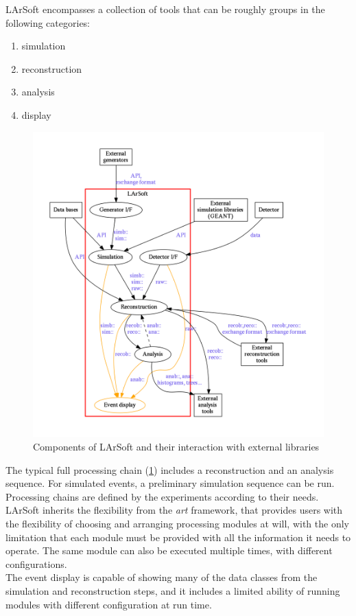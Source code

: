 
LArSoft encompasses a collection of tools that can be roughly groups in
the following categories:

\begin{enumerate}
  \item simulation
  \item reconstruction
  \item analysis
  \item[\textbullet] display
\end{enumerate}

\begin{figure}[htbp]
\centering
\includegraphics[width=\textwidth]{figures/LArSoftArchitectureGraph.pdf}
\caption{\label{fig:LArSoftProcessingChain}Components of LArSoft and
their interaction with external libraries}
\end{figure}

The typical full processing chain (\cref{fig:LArSoftProcessingChain})
includes a reconstruction and an
analysis sequence. For simulated events, a preliminary simulation
sequence can be run.\\
Processing chains are defined by the experiments according to their
needs. LArSoft inherits the flexibility from the \emph{art} framework,
that provides users with the flexibility of choosing and arranging
processing modules at will, with the only limitation that each module
must be provided with all the information it needs to operate. The same
module can also be executed multiple times, with different
configurations.\\
The event display is capable of showing many of the data classes from
the simulation and reconstruction steps, and it includes a limited
ability of running modules with different configuration at run time.

